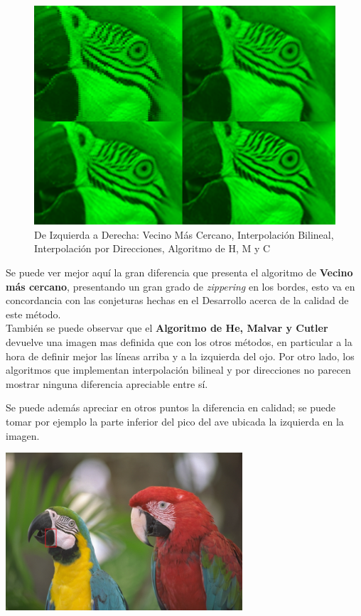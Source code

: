 \documentclass[a4paper]{article}
\begin{document}
\begin{figure}[h!]
\centering
\includegraphics[width=340pt]{img/Tomo1.png}
\caption{De Izquierda a Derecha: Vecino Más Cercano, Interpolación Bilineal, Interpolación por Direcciones, Algoritmo de H, M y C}
\end{figure}

Se puede ver mejor aquí la gran diferencia que presenta el algoritmo de \textbf{Vecino más cercano}, presentando un gran grado de \textit{zippering} en los bordes, esto va en concordancia con las conjeturas hechas en el Desarrollo acerca de la calidad de este método.\\
También se puede observar que el \textbf{Algoritmo de He, Malvar y Cutler} devuelve una imagen mas definida que con los otros métodos, en particular a la hora de definir mejor las líneas arriba y a la izquierda del ojo.\newline
Por otro lado, los algoritmos que implementan interpolación bilineal y por direcciones no parecen mostrar ninguna diferencia apreciable entre sí.\newline \newline

Se puede además apreciar en otros puntos la diferencia en calidad; se puede tomar por ejemplo la parte inferior del pico del ave ubicada la izquierda en la imagen.\newline \\
\begin{center}
\includegraphics[width=250pt]{img/img1-con-recuadro.png}\\
\end{center}
\end{document}
